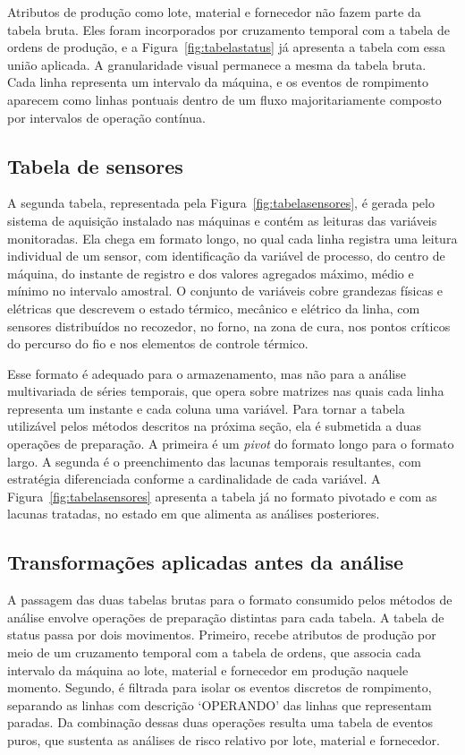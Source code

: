 \documentclass[12pt]{article}
\begin{document}
%
{Atributos de produção como lote, material e fornecedor não fazem parte da tabela bruta. Eles foram incorporados por cruzamento temporal com a tabela de ordens de produção, e a Figura~\ref{fig:tabelastatus} já apresenta a tabela com essa união aplicada. A granularidade visual permanece a mesma da tabela bruta. Cada linha representa um intervalo da máquina, e os eventos de rompimento aparecem como linhas pontuais dentro de um fluxo majoritariamente composto por intervalos de operação contínua.}
%

\subsection{Tabela de sensores}
%
{A segunda tabela, representada pela Figura~\ref{fig:tabelasensores}, é gerada pelo sistema de aquisição instalado nas máquinas e contém as leituras das variáveis monitoradas. Ela chega em formato longo, no qual cada linha registra uma leitura individual de um sensor, com identificação da variável de processo, do centro de máquina, do instante de registro e dos valores agregados máximo, médio e mínimo no intervalo amostral. O conjunto de variáveis cobre grandezas físicas e elétricas que descrevem o estado térmico, mecânico e elétrico da linha, com sensores distribuídos no recozedor, no forno, na zona de cura, nos pontos críticos do percurso do fio e nos elementos de controle térmico.}
%

{Esse formato é adequado para o armazenamento, mas não para a análise multivariada de séries temporais, que opera sobre matrizes nas quais cada linha representa um instante e cada coluna uma variável. Para tornar a tabela utilizável pelos métodos descritos na próxima seção, ela é submetida a duas operações de preparação. A primeira é um \textit{pivot} do formato longo para o formato largo. A segunda é o preenchimento das lacunas temporais resultantes, com estratégia diferenciada conforme a cardinalidade de cada variável. A Figura~\ref{fig:tabelasensores} apresenta a tabela já no formato pivotado e com as lacunas tratadas, no estado em que alimenta as análises posteriores.}
%

\subsection{Transformações aplicadas antes da análise}
%
{A passagem das duas tabelas brutas para o formato consumido pelos métodos de análise envolve operações de preparação distintas para cada tabela. A tabela de status passa por dois movimentos. Primeiro, recebe atributos de produção por meio de um cruzamento temporal com a tabela de ordens, que associa cada intervalo da máquina ao lote, material e fornecedor em produção naquele momento. Segundo, é filtrada para isolar os eventos discretos de rompimento, separando as linhas com descrição \textsc{`OPERANDO'} das linhas que representam paradas. Da combinação dessas duas operações resulta uma tabela de eventos puros, que sustenta as análises de risco relativo por lote, material e fornecedor.}
%
\end{document}
